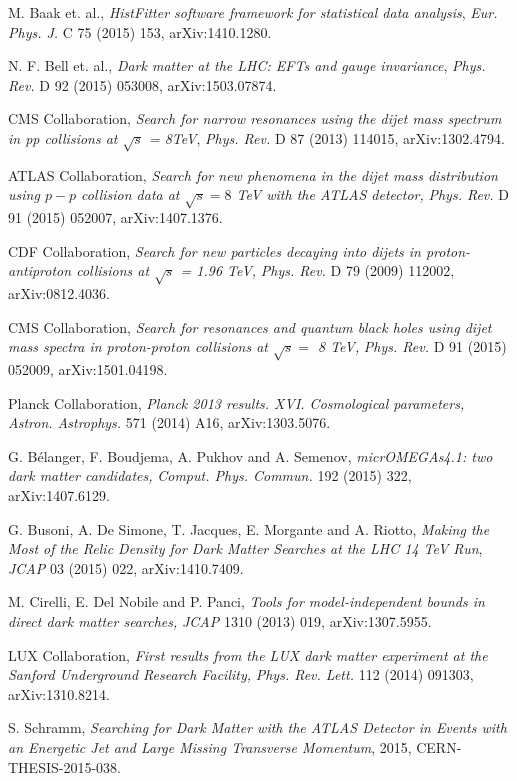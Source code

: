  M. Baak et. al., \emph{HistFitter software framework for statistical data analysis}, \emph{Eur. Phys. J.} C 75 (2015) 153, arXiv:1410.1280.

 N. F. Bell et. al., \emph{Dark matter at the LHC: EFTs and gauge invariance}, \emph{Phys. Rev.} D 92 (2015) 053008, arXiv:1503.07874.

 CMS Collaboration, \emph{Search for narrow resonances using the dijet mass spectrum in pp collisions at $\sqrt{s}$ = 8TeV}, \emph{Phys. Rev.} D 87 (2013) 114015, arXiv:1302.4794.

 ATLAS Collaboration,
 \emph{Search for new phenomena in the dijet mass distribution using $p-p$ collision data at $\sqrt{s}=8$ TeV with the ATLAS detector,} \emph{Phys. Rev.} D 91 (2015) 052007, arXiv:1407.1376.

 CDF Collaboration,
  \emph{Search for new particles decaying into dijets in proton-antiproton collisions at $\sqrt{s}$ = 1.96 TeV,}
  \emph{Phys. Rev.} D 79 (2009) 112002,
  arXiv:0812.4036.

 CMS Collaboration,
  \emph{Search for resonances and quantum black holes using dijet mass spectra in proton-proton collisions at $\sqrt{s} =$ 8 TeV,} \emph{Phys. Rev.} D 91 (2015) 052009, arXiv:1501.04198.

 Planck Collaboration,
\emph{Planck 2013 results. XVI. Cosmological parameters,}
\emph{Astron. Astrophys.} 571 (2014) A16, arXiv:1303.5076.

 G. B\'{e}langer, F. Boudjema, A. Pukhov and A. Semenov,
\emph{micrOMEGAs4.1: two dark matter candidates,}
  \emph{Comput. Phys. Commun.} 192 (2015) 322,
  arXiv:1407.6129.

 G. Busoni, A. De Simone, T. Jacques, E. Morgante and A. Riotto, \emph{Making the Most of the Relic Density for Dark Matter Searches at the LHC 14 TeV Run}, \emph{JCAP} 03 (2015) 022, arXiv:1410.7409.

 M. Cirelli, E. Del Nobile and P. Panci,
  \emph{Tools for model-independent bounds in direct dark matter searches,}
  \emph{JCAP} 1310 (2013) 019, arXiv:1307.5955.

 LUX Collaboration, \emph{First results from the LUX dark matter experiment at the Sanford Underground Research Facility,}
  \emph{Phys. Rev. Lett.} 112 (2014) 091303, arXiv:1310.8214.

 S. Schramm, \emph{Searching for Dark Matter with the ATLAS Detector in Events with an Energetic Jet and Large Missing Transverse Momentum}, 2015, CERN-THESIS-2015-038.

